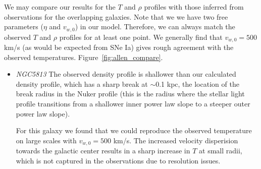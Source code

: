 \documentclass[usenatbib,fleqn]{mn2e}
\newcommand{\vwO}{v_{w,0}}
\begin{document}
We may compare our results for the $T$ and $\rho$ profiles with those
inferred from observations for the overlapping galaxies.  Note that we
we have two free parameters ($\eta$ and $\vwO$) in our
model. Therefore, we can always match the observed $T$ and $\rho$
profiles for at least one point.  We generally find that $\vwO=500$
km/s (as would be expected from SNe Ia) gives rough agreement with the
observed temperatures. 
Figure~\ref{fig:allen_compare}.

\begin{itemize}


\item \emph{NGC5813} %
  The observed density profile \citealt{RussellMcNamara+:2013a} is
  shallower than our calculated density profile, which has a sharp
  break at $\sim$0.1 kpc, the location of the break radius in the
  Nuker profile (this is the radius where the stellar light profile
  transitions from a shallower inner power law slope to a steeper
  outer power law slope).

  For this galaxy we found that we could reproduce the observed
  temperature on large scales with $\vwO=500$ km/s. The increased
  velocity disperision towards the galactic center results in a sharp
  increase in $T$ at small radii, which is not captured in the
  observations due to resolution issues.
\end{itemize}
\end{document}
